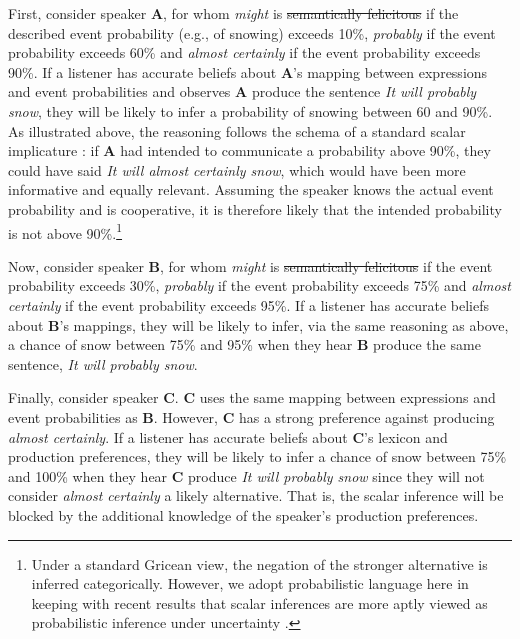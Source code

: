 \documentclass[man, floatsintext]{apa6}
\providecommand{\DIFadd}[1]{{\protect\color{blue}\uwave{#1}}} %
\providecommand{\DIFdel}[1]{{\protect\color{red}\sout{#1}}}                      %
\providecommand{\DIFaddbegin}{} %
\providecommand{\DIFaddend}{} %
\providecommand{\DIFdelbegin}{} %
\providecommand{\DIFdelend}{} %
\newcommand{\DIFscaledelfig}{0.5}
\newlength{\DIFdelgraphicswidth} %
\newlength{\DIFdelgraphicsheight} %
\newcommand{\DIFaddincludegraphics}[2][]{{\color{blue}\fbox{\DIFOincludegraphics[#1]{#2}}}} %
\newcommand{\DIFdelincludegraphics}[2][]{%
\sbox{\DIFdelgraphicsbox}{\DIFOincludegraphics[#1]{#2}}%
\settoboxwidth{\DIFdelgraphicswidth}{\DIFdelgraphicsbox} %
\settoboxtotalheight{\DIFdelgraphicsheight}{\DIFdelgraphicsbox} %
\scalebox{\DIFscaledelfig}{%
\parbox[b]{\DIFdelgraphicswidth}{\usebox{\DIFdelgraphicsbox}\\[-\baselineskip] \rule{\DIFdelgraphicswidth}{0em}}\llap{\resizebox{\DIFdelgraphicswidth}{\DIFdelgraphicsheight}{%
\setlength{\unitlength}{\DIFdelgraphicswidth}%
\begin{picture}(1,1)%
\thicklines\linethickness{2pt} %
{\color[rgb]{1,0,0}\put(0,0){\framebox(1,1){}}}%
{\color[rgb]{1,0,0}\put(0,0){\line( 1,1){1}}}%
{\color[rgb]{1,0,0}\put(0,1){\line(1,-1){1}}}%
\end{picture}%
}\hspace*{3pt}}} %
} %
\DeclareRobustCommand{\DIFaddbegin}{\DIFOaddbegin \let\includegraphics\DIFaddincludegraphics} %
\DeclareRobustCommand{\DIFaddend}{\DIFOaddend \let\includegraphics\DIFOincludegraphics} %
\DeclareRobustCommand{\DIFdelbegin}{\DIFOdelbegin \let\includegraphics\DIFdelincludegraphics} %
\DeclareRobustCommand{\DIFdelend}{\DIFOaddend \let\includegraphics\DIFOincludegraphics} %
\begin{document}
First, consider speaker {\bf A}, for whom \textit{might} is \DIFdelbegin \DIFdel{semantically felicitous }\DIFdelend \DIFaddbegin \DIFadd{true }\DIFaddend if the described event probability (e.g., of snowing) exceeds 10\%, 
\textit{probably} if the event probability exceeds 60\% and \textit{almost certainly}  if the event probability exceeds 90\%.  If a listener has accurate beliefs about {\bf A}'s mapping between expressions and event probabilities and observes {\bf A}  produce the sentence \emph{It will probably snow}, they will be likely to infer a probability of snowing between 60 and 90\%. As illustrated above, the reasoning follows the schema of a standard scalar implicature \parencite{Grice1975, Horn1984}: if  {\bf A} had intended to communicate a probability above 90\%, they could have said \emph{It will almost certainly snow}, which would have been more informative and equally relevant. Assuming the speaker knows the actual event probability and is cooperative, it is therefore likely that the intended probability is not above 90\%.\footnote{Under a standard Gricean view, the negation of the stronger alternative is inferred categorically. However, we adopt probabilistic language here in keeping with recent results that scalar inferences are more aptly viewed as probabilistic inference under uncertainty \parencite{Goodman2013}.} 

Now, consider speaker {\bf B}, for whom \textit{might} is \DIFdelbegin \DIFdel{semantically felicitous }\DIFdelend \DIFaddbegin \DIFadd{true }\DIFaddend if the event probability exceeds 30\%, 
\textit{probably} if the event probability exceeds 75\% and \textit{almost certainly}  if the event probability exceeds 95\%. If a listener has
accurate beliefs about {\bf B}'s mappings, they will be likely to infer, via the same reasoning as above, a chance of snow between 75\% and 95\% when they hear {\bf B} produce the same sentence, \textit{It will probably snow}.

Finally, consider speaker {\bf C}. {\bf C} uses the same mapping between expressions and event probabilities as {\bf B}. However, {\bf C} has a strong preference against 
producing \textit{almost certainly}. If a listener has accurate beliefs about {\bf C}'s lexicon and production preferences, 
they will be likely to infer a chance of snow between 75\% and 100\% when they hear {\bf C} produce \textit{It will probably snow} since they will not
consider  \textit{almost certainly} a likely alternative. That is, the scalar inference will be blocked by the additional knowledge of the speaker's production preferences. 
\end{document}
